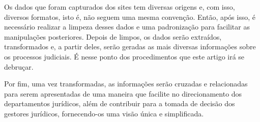 Os dados que foram capturados dos sites tem diversas origens e, com isso, diversos formatos, isto é, não seguem uma mesma convenção. Então, após isso, é necessário realizar a limpeza desses dados e uma padronização para facilitar as manipulações posteriores. Depois de limpos, os dados serão extraídos, transformados e, a partir deles, serão geradas as mais diversas informações sobre os processos judiciais. É nesse ponto dos procedimentos que este artigo irá se debruçar.

Por fim, uma vez transformadas, as informações serão cruzadas e relacionadas para serem apresentadas de uma maneira que facilite no direcionamento dos departamentos jurídicos, além de contribuir para a tomada de decisão dos gestores jurídicos, fornecendo-os uma visão única e simplificada.





